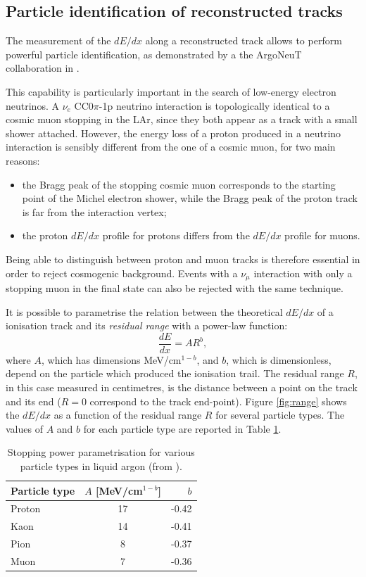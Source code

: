 \subsection{Particle identification of reconstructed tracks}\label{sec:proton_id}
The measurement of the $dE/dx$ along a reconstructed track allows to perform powerful particle identification, as demonstrated by a the ArgoNeuT collaboration in \cite{Acciarri:2013met}. 

This capability is particularly important in the search of low-energy electron neutrinos. A $\nu_e$ CC0$\pi$-1p neutrino interaction is topologically identical to a cosmic muon stopping in the LAr, since they both appear as a track with a small shower attached. However, the energy loss of a proton produced in a neutrino interaction is sensibly different from the one of a cosmic muon, for two main reasons:
\begin{itemize}
    \item the Bragg peak of the stopping cosmic muon corresponds to the starting point of the Michel electron shower, while the Bragg peak of the proton track is far from the interaction vertex;
    \item the proton $dE/dx$ profile for protons differs from the $dE/dx$ profile for muons.
\end{itemize}
Being able to distinguish between proton and muon tracks is therefore essential in order to reject cosmogenic background. Events with a $\nu_{\mu}$ interaction with only a stopping muon in the final state can also be rejected with the same technique.

It is possible to parametrise the relation between the theoretical $dE/dx$ of a ionisation track and its \emph{residual range} with a power-law function:
\begin{equation}
    \frac{dE}{dx} = A R^b,
\end{equation}
where $A$, which has dimensions MeV/cm$^{1-b}$, and $b$, which is dimensionless, depend on the particle which produced the ionisation trail. The residual range $R$, in this case measured in centimetres, is the distance between a point on the track and its end ($R=0$ correspond to the track end-point).
Figure \ref{fig:range} shows the $dE/dx$ as a function of the residual range $R$ for several particle types. The values of $A$ and $b$ for each particle type are reported in Table \ref{tab:range}.

\begin{table}[htbp]
   \centering
   \caption{Stopping power parametrisation for various particle types in liquid argon (from \cite{Acciarri:2013met}).}\label{tab:range}
   \begin{tabular}{lcr}
     \toprule
     Particle type & $A$ [MeV/cm$^{1-b}$] & $b$ \\
     \midrule
     Proton & 17 & -0.42 \\
     Kaon & 14 & -0.41 \\
     Pion & 8 & -0.37 \\
     Muon & 7 & -0.36 \\
     \bottomrule
   \end{tabular}
\end{table}

